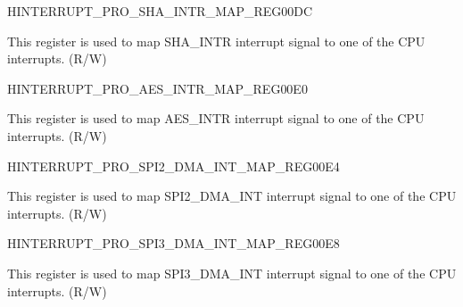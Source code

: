 \begin{register}{H}{INTERRUPT\_PRO\_SHA\_INTR\_MAP\_REG}{\hexprefix{}00DC}\label{regdesc:INTERRUPTPROSHAINTRMAPREG}
%
%
\regnewline%
\begin{regdesc}\begin{reglist}
\label{fielddesc:INTERRUPTPROSHAINTRMAP}\item [INTERRUPT\_PRO\_SHA\_INTR\_MAP] This register is used to map SHA\_INTR interrupt signal to one of the CPU interrupts. (R/W)
\end{reglist}\end{regdesc}
\end{register}


\begin{register}{H}{INTERRUPT\_PRO\_AES\_INTR\_MAP\_REG}{\hexprefix{}00E0}\label{regdesc:INTERRUPTPROAESINTRMAPREG}
%
%
\regnewline%
\begin{regdesc}\begin{reglist}
\label{fielddesc:INTERRUPTPROAESINTRMAP}\item [INTERRUPT\_PRO\_AES\_INTR\_MAP] This register is used to map AES\_INTR interrupt signal to one of the CPU interrupts. (R/W)
\end{reglist}\end{regdesc}
\end{register}


\begin{register}{H}{INTERRUPT\_PRO\_SPI2\_DMA\_INT\_MAP\_REG}{\hexprefix{}00E4}\label{regdesc:INTERRUPTPROSPI2DMAINTMAPREG}
%
%
\regnewline%
\begin{regdesc}\begin{reglist}
\label{fielddesc:INTERRUPTPROSPI2DMAINTMAP}\item [INTERRUPT\_PRO\_SPI2\_DMA\_INT\_MAP] This register is used to map SPI2\_DMA\_INT interrupt signal to one of the CPU interrupts. (R/W)
\end{reglist}\end{regdesc}
\end{register}


\begin{register}{H}{INTERRUPT\_PRO\_SPI3\_DMA\_INT\_MAP\_REG}{\hexprefix{}00E8}\label{regdesc:INTERRUPTPROSPI3DMAINTMAPREG}
%
%
\regnewline%
\begin{regdesc}\begin{reglist}
\label{fielddesc:INTERRUPTPROSPI3DMAINTMAP}\item [INTERRUPT\_PRO\_SPI3\_DMA\_INT\_MAP] This register is used to map SPI3\_DMA\_INT interrupt signal to one of the CPU interrupts. (R/W)
\end{reglist}\end{regdesc}
\end{register}




